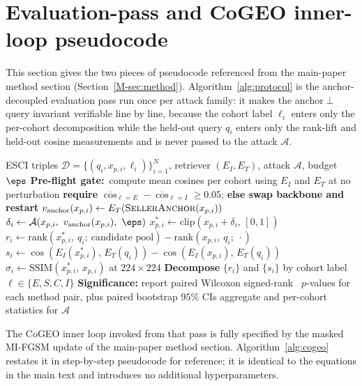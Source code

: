 \section{Evaluation-pass and CoGEO inner-loop pseudocode}
\label{sm:cogeo-pseudocode}

This section gives the two pieces of pseudocode referenced from the main-paper method section (Section~\ref{M-sec:method}). Algorithm~\ref{alg:protocol} is the anchor-decoupled evaluation pass run once per attack family: it makes the anchor$\perp$query invariant verifiable line by line, because the cohort label $\ell_i$ enters only the per-cohort decomposition while the held-out query $q_i$ enters only the rank-lift and held-out cosine measurements and is never passed to the attack $\mathcal{A}$.

\begin{algorithm}[t]
\caption{Anchor-decoupled evaluation pass (per attack family).}
\label{alg:protocol}
\small
\begin{algorithmic}[1]
\Require ESCI triples $\mathcal{D}=\{(q_i, x_{p,i}, \ell_i)\}_{i=1}^{N}$, retriever $(E_I, E_T)$, attack $\mathcal{A}$, budget $\eps$
\State \textbf{Pre-flight gate:}\ compute mean cosines per cohort using $E_I$ and $E_T$ at no perturbation
\State \quad \textbf{require} $\overline{\cos}_{\ell=E} - \overline{\cos}_{\ell=I} \geq 0.05$; \textbf{else swap backbone and restart}
  \State $v_{\mathrm{anchor}}(x_{p,i}) \gets E_T(\textsc{SellerAnchor}(x_{p,i}))$
  \State $\delta_i \gets \mathcal{A}(x_{p,i},\ v_{\mathrm{anchor}}(x_{p,i}),\ \eps)$
  \State $x_{p,i}^* \gets \text{clip}(x_{p,i} + \delta_i,\,[0,1])$
  \State $r_i \gets \text{rank}(x_{p,i}^*,\ q_i;\ \text{candidate pool}) - \text{rank}(x_{p,i},\ q_i;\ \cdot)$
  \State $s_i \gets \cos(E_I(x_{p,i}^*),\,E_T(q_i)) - \cos(E_I(x_{p,i}),\,E_T(q_i))$
  \State $\sigma_i \gets \mathrm{SSIM}(x_{p,i}^*,\,x_{p,i})$ at $224\times 224$
\EndFor
\State \textbf{Decompose} $\{r_i\}$ and $\{s_i\}$ by cohort label $\ell\in\{E,S,C,I\}$
\State \textbf{Significance:} report paired Wilcoxon signed-rank~\cite{wilcoxon1945individual} $p$-values for each method pair, plus paired bootstrap $95\%$ CIs
\State \Return aggregate and per-cohort statistics for $\mathcal{A}$
\end{algorithmic}
\end{algorithm}

The CoGEO inner loop invoked from that pass is fully specified by the masked MI-FGSM update of the main-paper method section. Algorithm~\ref{alg:cogeo} restates it in step-by-step pseudocode for reference; it is identical to the equations in the main text and introduces no additional hyperparameters.


